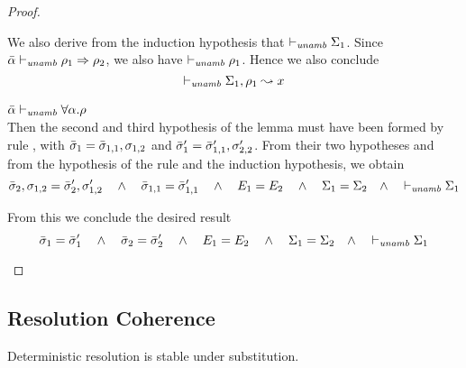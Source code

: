 \begin{proof}
\begin{description}
  We also derive from the induction hypothesis that $\vdash_{\mathit{unamb}} \Sigma_1$. 
  Since $\bar{\alpha} \vdash_{\mathit{unamb}} \rho_1 \Rightarrow \rho_2$, we also have $\vdash_{\mathit{unamb}} \rho_1$.
  Hence we also conclude
\begin{equation*}
  \vdash_{\mathit{unamb}} \Sigma_1, \rho_1 \leadsto x
\end{equation*}


\item[\fbox{\texttt{(UA-TAbs)}}]\quad$\bar{\alpha} \vdash_{\mathit{unamb}} \forall \alpha.\rho$ \ \\
  Then the second and third hypothesis of the lemma must have been formed by rule ,
  with $\bar{\sigma}_1 = \bar{\sigma}_{1,1},\sigma_{1,2}$ and $\bar{\sigma}_1' = \bar{\sigma}_{1,1}',\sigma_{2,2}'$.
  From their two hypotheses and from the hypothesis of the rule and the induction hypothesis, we obtain
\begin{equation*}
  \bar{\sigma}_2,\sigma_{1,2} = \bar{\sigma}_2',\sigma_{1,2}' 
  \quad\wedge\quad 
  \bar{\sigma}_{1,1} = \bar{\sigma}_{1,1}'
  \quad\wedge\quad 
  E_1 = E_2
  \quad\wedge\quad 
  \Sigma_1 = \Sigma_2
  \quad\wedge\quad 
  \vdash_{\mathit{unamb}} \Sigma_1
\end{equation*}
  
  From this we conclude the desired result 
\begin{equation*}
  \bar{\sigma}_1 = \bar{\sigma}_1' \quad\wedge\quad \bar{\sigma}_2 = \bar{\sigma}_2'
  \quad\wedge\quad 
  E_1 = E_2
  \quad\wedge\quad 
  \Sigma_1 = \Sigma_2
  \quad\wedge\quad 
  \vdash_{\mathit{unamb}} \Sigma_1
\end{equation*}
   
\end{description}
\end{proof}

\subsection{Resolution Coherence}\label{proof:coherence}

Deterministic resolution is stable under substitution.

{\centering
{}}

